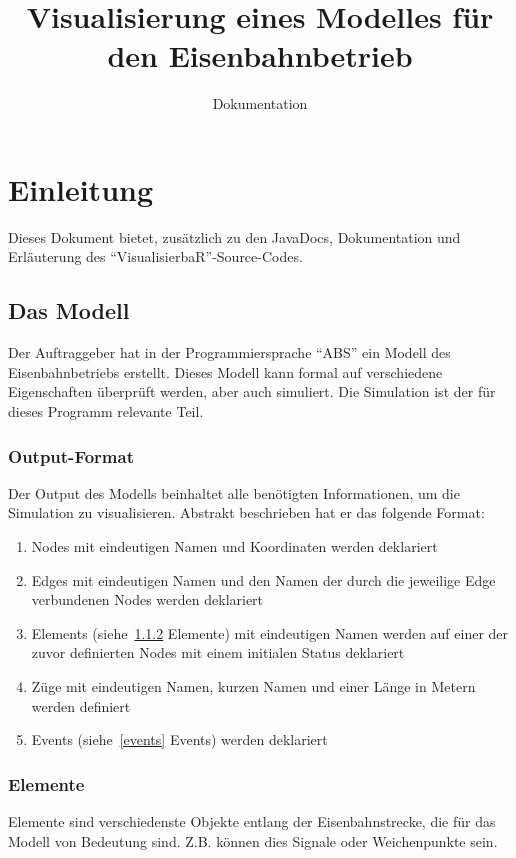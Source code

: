 \documentclass[accentcolor=tud0b,12pt,paper=a4]{tudreport}
\title{Visualisierung eines Modelles für den Eisenbahnbetrieb}
\subtitle{Dokumentation} %
\begin{document}
	\maketitle
	\tableofcontents
	
	\chapter{Einleitung}
		Dieses Dokument bietet, zusätzlich zu den JavaDocs, Dokumentation und Erläuterung des "`VisualisierbaR"'-Source-Codes.
		
	\section{Das Modell}
		Der Auftraggeber hat in der Programmiersprache "`ABS"' ein Modell des Eisenbahnbetriebs erstellt. Dieses Modell kann formal auf verschiedene Eigenschaften überprüft werden, aber auch simuliert. Die Simulation ist der für dieses Programm relevante Teil.
		
		\subsection{Output-Format}
			Der Output des Modells beinhaltet alle benötigten Informationen, um die Simulation zu visualisieren. Abstrakt beschrieben hat er das folgende Format:\\
			
			\begin{enumerate}
				\item Nodes mit eindeutigen Namen und Koordinaten werden deklariert
				\item Edges mit eindeutigen Namen und den Namen der durch die jeweilige Edge verbundenen Nodes werden deklariert
				\item Elements (siehe~\ref{elements} Elemente) mit eindeutigen Namen werden auf einer der zuvor definierten Nodes mit einem initialen Status deklariert
				\item Züge mit eindeutigen Namen, kurzen Namen und einer Länge in Metern werden definiert
				\item Events (siehe~\ref{events} Events) werden deklariert
			\end{enumerate}
			
			
		\subsection{Elemente}
		\label{elements}
			Elemente sind verschiedenste Objekte entlang der Eisenbahnstrecke, die für das Modell von Bedeutung sind. Z.B. können dies Signale oder Weichenpunkte sein.\\
			
\end{document}
